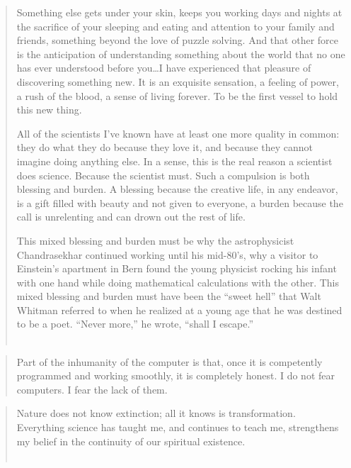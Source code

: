 \documentclass[letterpaper,draft]{memoir}
\begin{document}
\begin{quote}Something else gets under your skin, keeps you working days and nights at the
sacrifice of your sleeping and eating and attention to your family and friends,
something beyond the love of puzzle solving. And that other force is the
anticipation of understanding something about the world that no one has ever
understood before you\ldots I have experienced that pleasure of discovering
something new. It is an exquisite sensation, a feeling of power, a rush of the
blood, a sense of living forever. To be the first vessel to hold this new
thing.

\noindent All of the scientists I've known have at least one more quality in common:
they do what they do because they love it, and because they cannot imagine
doing anything else. In a sense, this is the real reason a scientist does
science. Because the scientist must. Such a compulsion is both blessing and
burden. A blessing because the creative life, in any endeavor, is a gift
filled with beauty and not given to everyone, a burden because the call is
unrelenting and can drown out the rest of life.

\noindent This mixed blessing and burden must be why the astrophysicist Chandrasekhar
continued working until his mid-80's, why a visitor to Einstein's apartment in
Bern found the young physicist rocking his infant with one hand while doing
mathematical calculations with the other. This mixed blessing and burden must
have been the ``sweet hell'' that Walt Whitman referred to when he realized at a
young age that he was destined to be a poet. ``Never more,'' he wrote, ``shall I
escape.''\\
\\
\end{quote}
\vspace{.2in}
\begin{quote}Part of the inhumanity of the computer is that, once it is competently
 programmed and working smoothly, it is completely honest. I do not fear
 computers. I fear the lack of them.\\
\end{quote}
\vspace{.2in}
\begin{quote}Nature does not know extinction; all it knows is transformation. Everything
 science has taught me, and continues to teach me, strengthens my belief in the
 continuity of our spiritual existence.\\
\vspace{2mm}
\\
\end{quote}
\end{document}
